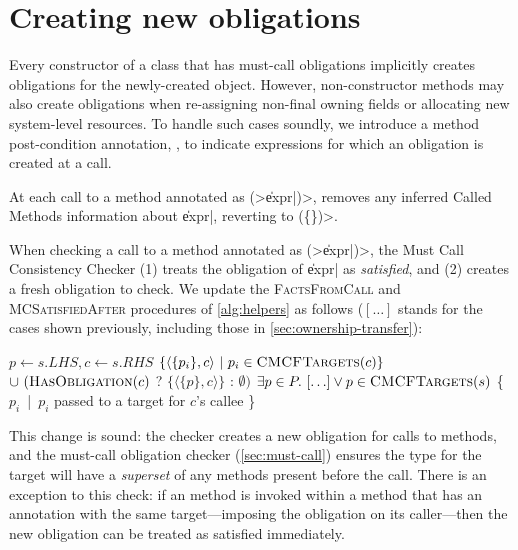 \section{Creating new obligations}
\label{sec:reset-must-call}



Every constructor of a class that has must-call obligations
implicitly creates obligations for the newly-created object.
However, non-constructor methods may also create obligations
when re-assigning non-final owning fields or allocating
new system-level resources.
To handle such cases soundly, we introduce a method post-condition annotation,
\CreatesMustCallFor,
to indicate expressions for which an obligation is created at a call.

At each call to a method annotated as \CreatesMustCallFor\<(>\|expr|\<)>, \tool removes any
inferred Called Methods information about \|expr|, reverting to
\CalledMethods\<(\{\})>.

When checking a call to a method annotated as
\CreatesMustCallFor\<(>\|expr|\<)>, the Must Call Consistency Checker
(1) treats the \MustCall
obligation of \|expr| as \emph{satisfied},
and (2) creates a fresh obligation to check.
%
We update the \textsc{FactsFromCall} and \textsc{MCSatisfiedAfter} procedures of
\cref{alg:helpers} as follows ($[\ldots]$ stands for the cases shown previously,
including those in \cref{sec:ownership-transfer}):
\begin{algorithmic}
  \State $p \gets s.LHS, c \gets s.RHS$
  \State \Return $\{ \langle \{ p_i \}, c \rangle\ |\ p_i \in \textsc{CMCFTargets}(c) \}$ \newline
  \hspace*{5em} $\cup\ (\textsc{HasObligation}(c)$ ? $\{ \langle \{ p \}, c \rangle \}$ : $\emptyset)$
  \EndProcedure
  \State \Return $\exists p \in P .\ [\ldots] \vee p \in \textsc{CMCFTargets}(s)$
  \EndProcedure
  \State \Return \{ $p_i$\ |\ $p_i$ passed to a \CreatesMustCallFor target for $c$'s callee \}
  \EndProcedure
\end{algorithmic}
\noindent
This change is sound: the checker creates a new obligation for calls to
\CreatesMustCallFor methods, and the must-call obligation checker (\cref{sec:must-call}) ensures the
\MustCall type for the target will have a \emph{superset} of any methods present
before the call.
There is an exception to this check: if an \CreatesMustCallFor
method is invoked within a method that has an \CreatesMustCallFor annotation
with the same target---imposing the obligation on its caller---then
the new obligation can be treated as satisfied immediately.

